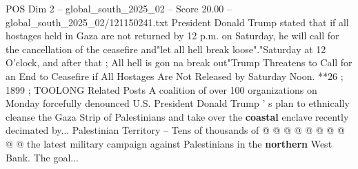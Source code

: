 \begin{textsample}{POS Dim 2 – global\_south\_2025\_02 – Score 20.00 – global\_south\_2025\_02/121150241.txt}
President Donald Trump stated that if all hostages held in Gaza are not returned by 12 p.m. on Saturday, he will call for the cancellation of the ceasefire and"let all hell break loose"."Saturday at 12 O'clock, and after that ; All hell is gon na break out"Trump Threatens to Call for an End to Ceasefire if All Hostages Are Not Released by Saturday Noon. **26 ; 1899 ; TOOLONG Related Posts A coalition of over 100 organizations on Monday forcefully denounced U.S.
President Donald Trump ' s plan to ethnically cleanse the Gaza Strip of Palestinians and take over the \textbf{coastal} enclave recently decimated by...
Palestinian Territory -- Tens of thousands of @ @ @ @ @ @ @ @ @ @ the latest military campaign against Palestinians in the \textbf{northern} West Bank.
The goal...

\end{textsample}
